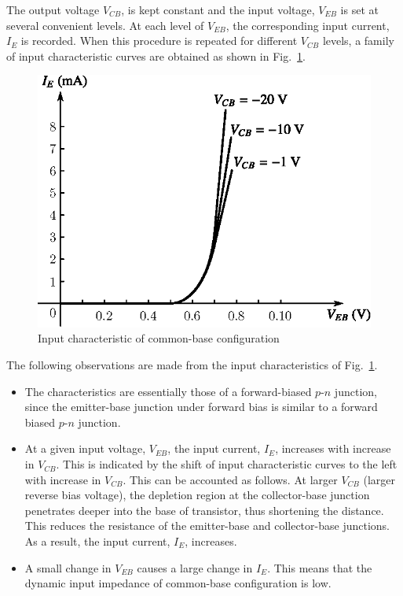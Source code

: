 The output voltage $V_{CB}$, is kept constant and the input voltage, $V_{EB}$ is set at several convenient levels. At each level of $V_{EB}$, the corresponding input current, $I_{E}$ is recorded. When this procedure is repeated for different $V_{CB}$ levels, a family of input characteristic curves are obtained as shown in Fig.~\ref{fig3.19}.
\begin{figure}[H]
\centering
\includegraphics{chap2/fig2.19.eps}
\caption{Input characteristic of common-base configuration}\label{fig3.19}
\end{figure}

The following observations are made from the input characteristics of Fig.~\ref{fig3.19}.
\begin{itemize}
\itemsep=2pt
\item The characteristics are essentially those of a forward-biased $p$-$n$ junction, since the emitter-base junction under forward bias is similar to a forward biased $p$-$n$ junction.

\item At a given input voltage, $V_{EB}$, the input current, $I_{E}$, increases with increase in $V_{CB}$. This is indicated by the shift of input characteristic curves to the left with increase in $V_{CB}$. This can be accounted as follows. At larger $V_{CB}$ (larger reverse bias voltage), the depletion region at the collector-base junction penetrates deeper into the base of transistor, thus shortening the distance. This reduces the resistance of the emitter-base and collector-base junctions. As a result, the input current, $I_{E}$, increases.

\item A small change in $V_{EB}$ causes a large change in $I_{E}$. This means that the dynamic input impedance of common-base configuration is low.
\end{itemize}

